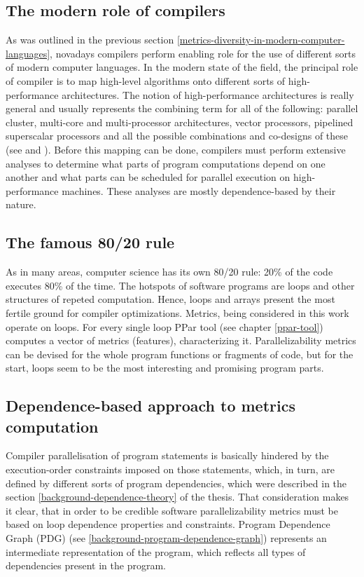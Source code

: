 \subsection{The modern role of compilers}
\label{metrics-modern-role-of-compilers}
\quad As was outlined in the previous section \ref{metrics-diversity-in-modern-computer-languages}, novadays compilers perform enabling role for the use of different sorts of modern computer languages. \newline
\null\quad In the modern state of the field, the principal role of compiler is to map high-level algorithms onto different sorts of high-performance architectures. The notion of high-performance architectures is really general and usually represents the combining term for all of the following: parallel cluster, multi-core and multi-processor architectures, vector processors, pipelined superscalar processors and all the possible combinations and co-designs of these (see \cite{patterson-and-hennessy-cod} and \cite{patterson-and-hennessy-quantitative-approach}).\newline
\null\quad Before this mapping can be done, compilers must perform extensive analyses to determine what parts of program computations depend on one another and what parts can be scheduled for parallel execution on high-performance machines. These analyses are mostly dependence-based by their nature.   

\subsection{The famous 80/20 rule}
\label{metrics-famous-80-20-rule}
\qquad As in many areas, computer science has its own 80/20 rule: 20\% of the code executes 80\% of the time. The hotspots of software programs are loops and other structures of repeted computation. Hence, loops and arrays present the most fertile ground for compiler optimizations. Metrics, being considered in this work operate on loops. For every single loop PPar tool (see chapter \ref{ppar-tool}) computes a vector of metrics (features), characterizing it. Parallelizability metrics can be devised for the whole program functions or fragments of code, but for the start, loops seem to be the most interesting and promising program parts. 

\subsection{Dependence-based approach to metrics computation}
\label{metrics-dependence-based-approach}
\qquad Compiler parallelisation of program statements is basically hindered by the execution-order constraints imposed on those statements, which, in turn, are defined by different sorts of program dependencies, which were described in the section \ref{background-dependence-theory} of the thesis. That consideration makes it clear, that in order to be credible software parallelizability metrics must be based on loop dependence properties and constraints. Program Dependence Graph (PDG) (see \ref{background-program-dependence-graph}) represents an intermediate representation of the program, which reflects all types of dependencies present in the program. 

